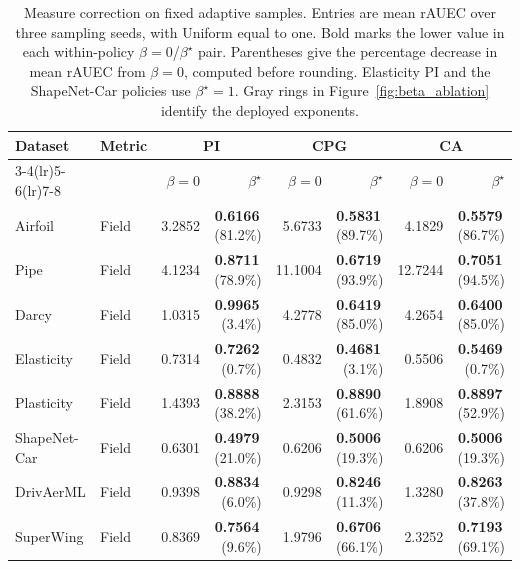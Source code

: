 \begin{table}[!htbp]
\centering
\small
\caption{Measure correction on fixed adaptive samples. Entries are mean rAUEC over three sampling seeds, with Uniform equal to one. Bold marks the lower value in each within-policy $\beta=0$/$\beta^{\star}$ pair. Parentheses give the percentage decrease in mean rAUEC from $\beta=0$, computed before rounding. Elasticity PI and the ShapeNet-Car policies use $\beta^{\star}=1$. Gray rings in Figure~\ref{fig:beta_ablation} identify the deployed exponents.}
\label{tab:beta_ablation}
\setlength{\tabcolsep}{3pt}
\begin{tabular}{@{}llrrrrrr@{}}
\toprule
Dataset & Metric & \multicolumn{2}{c}{PI} & \multicolumn{2}{c}{CPG} & \multicolumn{2}{c}{CA} \\
\cmidrule(lr){3-4}\cmidrule(lr){5-6}\cmidrule(lr){7-8}
& & $\beta=0$ & $\beta^{\star}$ & $\beta=0$ & $\beta^{\star}$ & $\beta=0$ & $\beta^{\star}$ \\
\midrule
Airfoil & Field & 3.2852 & \textbf{0.6166}\,{\footnotesize (81.2\%)} & 5.6733 & \textbf{0.5831}\,{\footnotesize (89.7\%)} & 4.1829 & \textbf{0.5579}\,{\footnotesize (86.7\%)} \\
Pipe & Field & 4.1234 & \textbf{0.8711}\,{\footnotesize (78.9\%)} & 11.1004 & \textbf{0.6719}\,{\footnotesize (93.9\%)} & 12.7244 & \textbf{0.7051}\,{\footnotesize (94.5\%)} \\
Darcy & Field & 1.0315 & \textbf{0.9965}\,{\footnotesize (3.4\%)} & 4.2778 & \textbf{0.6419}\,{\footnotesize (85.0\%)} & 4.2654 & \textbf{0.6400}\,{\footnotesize (85.0\%)} \\
Elasticity & Field & 0.7314 & \textbf{0.7262}\,{\footnotesize (0.7\%)} & 0.4832 & \textbf{0.4681}\,{\footnotesize (3.1\%)} & 0.5506 & \textbf{0.5469}\,{\footnotesize (0.7\%)} \\
Plasticity & Field & 1.4393 & \textbf{0.8888}\,{\footnotesize (38.2\%)} & 2.3153 & \textbf{0.8890}\,{\footnotesize (61.6\%)} & 1.8908 & \textbf{0.8897}\,{\footnotesize (52.9\%)} \\
ShapeNet-Car & Field & 0.6301 & \textbf{0.4979}\,{\footnotesize (21.0\%)} & 0.6206 & \textbf{0.5006}\,{\footnotesize (19.3\%)} & 0.6206 & \textbf{0.5006}\,{\footnotesize (19.3\%)} \\
DrivAerML & Field & 0.9398 & \textbf{0.8834}\,{\footnotesize (6.0\%)} & 0.9298 & \textbf{0.8246}\,{\footnotesize (11.3\%)} & 1.3280 & \textbf{0.8263}\,{\footnotesize (37.8\%)} \\
SuperWing & Field & 0.8369 & \textbf{0.7564}\,{\footnotesize (9.6\%)} & 1.9796 & \textbf{0.6706}\,{\footnotesize (66.1\%)} & 2.3252 & \textbf{0.7193}\,{\footnotesize (69.1\%)} \\

\end{tabular}
\end{table}
